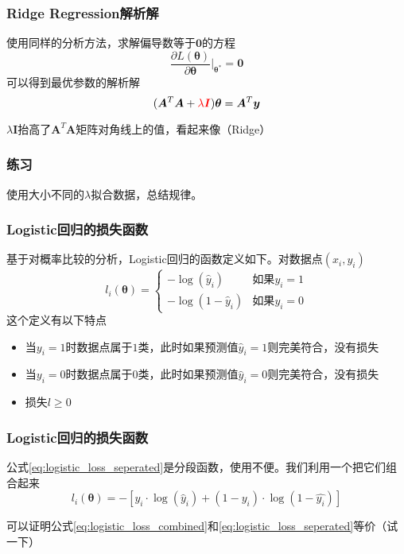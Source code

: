 \documentclass[14pt]{beamer}
\newcommand{\mat}[1]{\bm{#1}}
\renewcommand{\vec}[1]{\bm{#1}}
\newcommand{\MA}{\mat{A}}
\newcommand{\MI}{\mat{I}}
\newcommand{\Vy}{\vec{y}}
\newcommand{\Vt}{\vec{\theta}}
\let\emph\relax %
\begin{document}
\begin{frame}
  \frametitle{Ridge Regression解析解}
  使用同样的分析方法，求解偏导数等于$\vec{0}$的方程
  \begin{equation}
      \frac{\partial L(\Vt)}{\partial\Vt}\bigg|_{\Vt^*}=\vec{0}
  \end{equation}
  可以得到最优参数的解析解
  \begin{equation}
      (\MA^T\MA+{\color{red}\lambda\MI})\Vt=\MA^T\Vy
  \end{equation}

  $\lambda\MI$抬高了$\MA^T\MA$矩阵对角线上的值，看起来像\emph{山脊}（Ridge）
\end{frame}

\begin{frame}
  \frametitle{练习}
  使用大小不同的$\lambda$拟合数据，总结规律。
\end{frame}

\begin{frame}
  \frametitle{Logistic回归的损失函数}
  基于对概率比较的分析，Logistic回归的函数定义如下。对\emph{某个}数据点$(x_i, y_i)$
  \begin{equation}\label{eq:logistic_loss_seperated}
    l_i(\Vt)=\left\{\begin{array}{ll}
      -\log(\hat{y}_i) & \text{如果}y_i=1\\
      -\log(1-\hat{y}_i) & \text{如果}y_i=0
    \end{array}\right.
  \end{equation}
  这个定义有以下特点
  \begin{itemize}
    \item 当$y_i=1$时数据点属于$1$类，此时如果预测值$\hat{y}_i=1$则完美符合，没有损失
    \item 当$y_i=0$时数据点属于$0$类，此时如果预测值$\hat{y}_i=0$则完美符合，没有损失
    \item 损失$l\ge0$
  \end{itemize}
\end{frame}

\begin{frame}
  \frametitle{Logistic回归的损失函数}
  公式\ref{eq:logistic_loss_seperated}是分段函数，使用不便。我们利用一个\emph{小技巧}把它们组合起来
  \begin{equation}\label{eq:logistic_loss_combined}
    l_i(\Vt)=-[y_i\cdot\log(\hat{y}_i)+(1-y_i)\cdot\log(1-\hat{y_i})]
  \end{equation}

  可以证明公式\ref{eq:logistic_loss_combined}和\ref{eq:logistic_loss_seperated}等价（试一下）

\end{frame}
\end{document}
